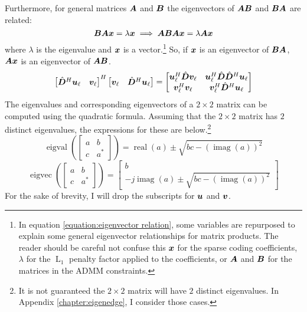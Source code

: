 Furthermore, for general matrices $\bm{A}$ and $\bm{B}$ the eigenvectors of $\bm{A}\bm{B}$ and $\bm{B}\bm{A}$ are related:
%
\begin{equation}
\bm{B}\bm{A}\bm{x} = \lambda\bm{x}  \implies  \bm{A}\bm{B}\bm{A}\bm{x} = \lambda\bm{A}\bm{x} \label{equation:eigenvector relation}
\end{equation}
%
where $\lambda$ is the eigenvalue and $\bm{x}$ is a vector.\footnote{In equation \ref{equation:eigenvector relation}, some variables are repurposed to explain some general eigenvector relationships for matrix products. The reader should be careful not confuse this $\bm{x}$ for the sparse coding coefficients, $\lambda$ for the $\operatorname{L}_1$ penalty factor applied to the coefficients, or $\bm{A}$ and $\bm{B}$ for the matrices in the ADMM constraints.}  So, if $\bm{x}$ is an eigenvector of $\bm{B}\bm{A}$, $\bm{A}\bm{x}$ is an eigenvector of $\bm{A}\bm{B}$.
%
%
\begin{equation}
\begin{bmatrix}
\hat{\bm{D}}^H\bm{u}_{\ell} & \bm{v}_{\ell}
\end{bmatrix}^H
\begin{bmatrix}
\bm{v}_{\ell} & \hat{\bm{D}}^H\bm{u}_{\ell} 
\end{bmatrix}
 = 
\begin{bmatrix}
\bm{u}_{\ell}^H\hat{\bm{D}}\bm{v}_{\ell} & \bm{u}_{\ell}^H\hat{\bm{D}}\hat{\bm{D}}^H\bm{u}_{\ell} \\
\bm{v}_{\ell}^H\bm{v}_{\ell}    & \bm{v}_{\ell}^H\hat{\bm{D}}^H\bm{u}_{\ell}
\end{bmatrix}
\end{equation}
%
The eigenvalues and corresponding eigenvectors of a $2 \times 2$ matrix can be computed using the quadratic formula. Assuming that the $2 \times 2$ matrix has $2$ distinct eigenvalues, the expressions for these are below.\footnote{It is not guaranteed the $2 \times 2$ matrix will have $2$ distinct eigenvalues. In Appendix \ref{chapter:eigenedge}, I consider those cases.}
%
\begin{equation}
\operatorname{eigval}\left(\begin{bmatrix} a & b \\ c & a^* \end{bmatrix}\right) = \operatorname{real}(a) \pm \sqrt{bc - (\operatorname{imag}(a))^2}
\end{equation}
%
\begin{equation}
\operatorname{eigvec}\left(\begin{bmatrix} a & b \\ c & a^* \end{bmatrix}\right) = \begin{bmatrix} b \\ -j\operatorname{imag}(a) \pm \sqrt{bc - (\operatorname{imag}(a))^2}\end{bmatrix}
\end{equation}
%
For the sake of brevity, I will drop the subscripts for $\bm{u}$ and $\bm{v}$.

